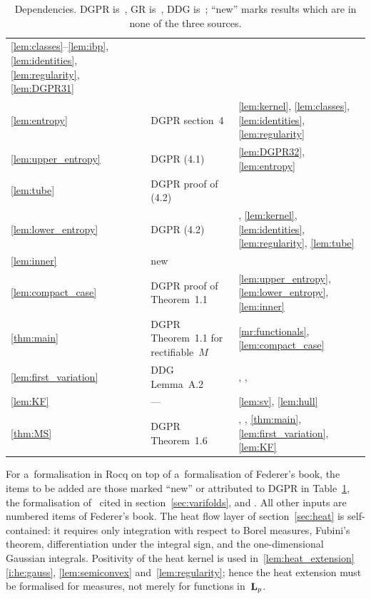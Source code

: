 \documentclass[a4paper,twoside,leqno]{article}
\begin{document}
\begin{table}[ht]
\begin{tabular}{p{}p{}p{}}
        \ref{lem:classes}--\ref{lem:ibp}, \ref{lem:identities}, \ref{lem:regularity},
        \ref{lem:DGPR31} \\
        \ref{lem:entropy} & DGPR section~4 & \ref{lem:kernel}, \ref{lem:classes},
        \ref{lem:identities}, \ref{lem:regularity} \\
        \ref{lem:upper_entropy} & DGPR (4.1) & \ref{lem:DGPR32}, \ref{lem:entropy} \\
        \ref{lem:tube} & DGPR proof of (4.2) & \cite[2.6.2, 2.7.16, 3.2.37, 3.2.39]{Federer1969} \\
        \ref{lem:lower_entropy} & DGPR (4.2) & \cite[2.4.19, 2.6.2]{Federer1969},
        \ref{lem:kernel}, \ref{lem:identities}, \ref{lem:regularity}, \ref{lem:tube} \\
        \ref{lem:inner} & new & \cite[2.2.2, 2.10.43, 3.2.14]{Federer1969} \\
        \ref{lem:compact_case} & DGPR proof of Theorem~1.1 & \ref{lem:upper_entropy},
        \ref{lem:lower_entropy}, \ref{lem:inner} \\
        \ref{thm:main} & DGPR Theorem~1.1 for rectifiable~$M$ & \ref{mr:functionals}, \ref{lem:compact_case} \\
        \ref{lem:first_variation} & DDG Lemma~A.2 & \cite[2.4(1), 3.2(1)]{Allard1972},
        \cite[Lemma~A.1]{DePhilippis2018}, \cite[2.4.9]{Federer1969} \\
        \ref{lem:KF} & --- & \ref{lem:sv}, \ref{lem:hull} \\
        \ref{thm:MS} & DGPR Theorem~1.6 & \cite[3.5]{Allard1972}, \cite[2.10.6, 2.10.19,
        3.2.14]{Federer1969}, \ref{thm:main}, \ref{lem:first_variation}, \ref{lem:KF}
    \end{tabular}
    \caption{Dependencies. DGPR is~\cite{DePhilippisGennaioliPigatiRindler2026}, GR
    is~\cite{Gennaioli2026}, DDG is~\cite{DePhilippis2018}; ``new'' marks results which are in
    none of the three sources.}
    \label{tab:dependencies}
\end{table}

\begin{remark}
    \label{rem:rocq}
    For a~formalisation in Rocq on top of a~formalisation of Federer's book, the items to be
    added are those marked ``new'' or attributed to DGPR in Table~\ref{tab:dependencies}, the
    formalisation of~\cite[2.3--4.3]{Allard1972} cited in section~\ref{sec:varifolds}, and
    \cite[Lemmas~A.1 and~A.2]{DePhilippis2018}. All other inputs are numbered items of
    Federer's book. The heat flow layer of section~\ref{sec:heat} is self-contained: it requires
    only integration with respect to Borel measures, Fubini's theorem, differentiation under the
    integral sign, and the one-dimensional Gaussian integrals. Positivity of the heat kernel is
    used in~\ref{lem:heat_extension}\ref{i:he:gauss}, \ref{lem:semiconvex}
    and~\ref{lem:regularity}; hence the heat extension must be formalised for measures, not
    merely for functions in~$\mathbf{L}_{p}$.
\end{remark}
\end{document}
